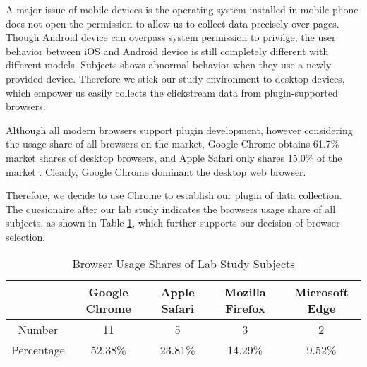 A major issue of mobile devices is the operating system installed in mobile phone does not
open the permission to allow us to collect data precisely over pages. Though Android device
can overpass system permission to privilge, the user behavior between iOS and Android device
is still completely different with different models. Subjects shows abnormal behavior when they
use a newly provided device. Therefore we stick our study environment to desktop devices, 
which empower us easily collects the clickstream data from plugin-supported browsers.

Although all modern browsers support plugin development, however considering the usage share of all browsers on the market,
Google Chrome obtains 61.7\% market shares of desktop browsers, and Apple Safari only shares
15.0\% of the market \cite{wiki2018share}. Clearly, Google Chrome dominant the desktop web browser.

Therefore, we decide to use Chrome to establish our plugin of data collection.
The quesionaire after our lab study indicates the browsers usage share of all subjects, 
as shown in Table \ref{table:sharesubjects}, which further supports our decision of 
browser selection.

\begin{table}[H]
    \small
    \centering
    \setlength{\belowcaptionskip}{10pt}
    \caption{Browser Usage Shares of Lab Study Subjects}
    \begin{tabular}{ccccc}
          \toprule
        & \textbf{Google Chrome} & \textbf{Apple Safari} & \textbf{Mozilla Firefox} & \textbf{Microsoft Edge} \\
          \hline
          Number     & 11 & 5 & 3 & 2 \\
          Percentage & 52.38\% & 23.81\% & 14.29\% & 9.52\% \\
          \bottomrule
    \end{tabular}
    \label{table:sharesubjects}
\end{table}



